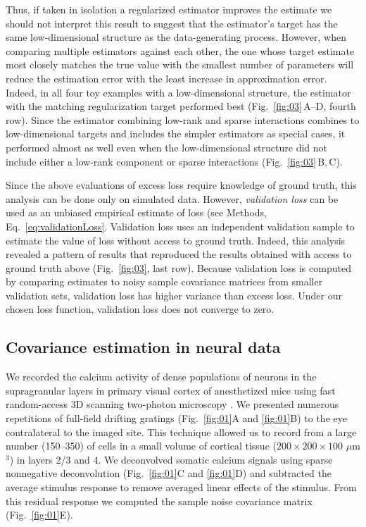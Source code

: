 Thus, if taken in isolation a regularized estimator improves the estimate we should not interpret this result to suggest that the estimator's target has the same low-dimensional structure as the data-generating process. However, when comparing multiple estimators against each other, the one whose target estimate most closely matches the true value with the smallest number of parameters will reduce the estimation error with the least increase in approximation error. Indeed, in all four toy examples with a low-dimensional structure, the estimator with the matching regularization target performed best (Fig.~\ref{fig:03}\,A--D, fourth row). 
Since the estimator combining low-rank and sparse interactions combines to low-dimensional targets and includes the simpler estimators as special cases, it performed almost as well even when the low-dimensional structure did not include either a low-rank component or sparse interactions (Fig.~\ref{fig:03}\,B,\,C). 

Since the above evaluations of excess loss require knowledge of ground truth, this analysis can be done only on simulated data. However, \emph{validation loss} can be used as an unbiased empirical estimate of loss  (see Methods, Eq.~\ref{eq:validationLoss}. Validation loss uses an independent validation sample to estimate the value of loss without access to ground truth.   Indeed, this analysis revealed a pattern of results that reproduced the results obtained with access to ground truth above (Fig.~\ref{fig:03}, last row). Because validation loss is computed by comparing estimates to noisy sample covariance matrices from smaller validation sets, validation loss has higher variance than excess loss. Under our chosen loss function, validation loss does not converge to zero. 

\subsection*{Covariance estimation in neural data}


We recorded the calcium activity of dense populations of neurons in the supragranular layers in primary visual cortex of anesthetized mice using fast random-access 3D scanning two-photon microscopy \cite{Stosiek:2003,Reddy:2005}. We presented numerous repetitions of full-field drifting gratings (Fig.~\ref{fig:01}A and \ref{fig:01}B) to the eye contralateral to the imaged site. This technique allowed us to record from a large number (150--350) of cells in a small volume of cortical tissue ($200\times200\times100$ $\mu$m$^3$) in layers 2/3 and 4. We deconvolved somatic calcium signals using sparse nonnegative deconvolution \cite{Vogelstein:2010} (Fig.~\ref{fig:01}C and \ref{fig:01}D) and subtracted the average stimulus response to remove averaged linear effects of the stimulus. From this residual response we computed the sample noise covariance matrix (Fig.~\ref{fig:01}E).

